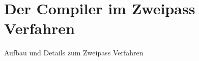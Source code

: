 \chapter{Der Compiler im Zweipass Verfahren}
\label{chap:theory:twopassCompiler}

Aufbau und Details zum Zweipass Verfahren
